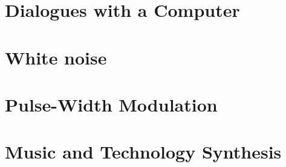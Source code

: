 \documentclass[a4paper,twoside]{book}
\begin{document}
\chapter{Dialogues with a Computer}
\label{chapter:dialogues-with-computer}







\newpage








\chapter{White noise}
\label{chapter:white-noise}








\chapter{Pulse-Width Modulation}
\label{chapter:pwm}






\chapter{Music and Technology Synthesis}
\label{chapter:music-and-technology-synthesis}
\end{document}

